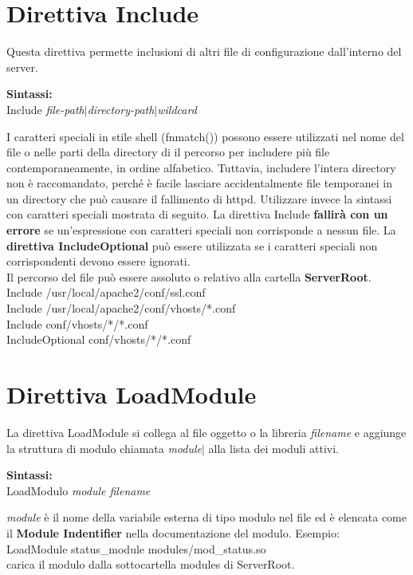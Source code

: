 \section{Direttiva Include}
Questa direttiva permette inclusioni di altri file di configurazione dall'interno del server. 
\begin{center}
    \textbf{Sintassi:}\\
    Include \emph{file-path}$|$\emph{directory-path}$|$\emph{wildcard}
\end{center}
I caratteri speciali in stile shell (fnmatch()) possono essere utilizzati nel nome del file o nelle parti della directory di
il percorso per includere più file contemporaneamente, in ordine alfabetico. Tuttavia, includere l'intera
directory non è raccomandato, perché è facile lasciare accidentalmente file temporanei in un
directory che può causare il fallimento di httpd. Utilizzare invece la sintassi con caratteri speciali mostrata di seguito.
La direttiva Include \textbf{fallirà con un errore} se un'espressione con caratteri speciali non corrisponde a nessun
file. La \textbf{direttiva IncludeOptional} può essere utilizzata se i caratteri speciali non corrispondenti devono essere
ignorati.\\
Il percorso del file può essere assoluto o relativo alla cartella \textbf{ServerRoot}.\vspace{0.2cm}\\
Include /usr/local/apache2/conf/ssl.conf\\
Include /usr/local/apache2/conf/vhosts/*.conf\\
Include conf/vhosts/*/*.conf\\
IncludeOptional conf/vhosts/*/*.conf\\

\section{Direttiva LoadModule}
La direttiva LoadModule si collega al file oggetto o la libreria \emph{filename} e aggiunge la struttura di modulo chiamata \emph{module}$|$ alla lista dei moduli attivi. 
\begin{center}
    \textbf{Sintassi:}\\
    LoadModulo \emph{module filename}
\end{center}
\emph{module} è il nome della variabile esterna di tipo modulo nel file ed è elencata come il \textbf{Module Indentifier} nella documentazione del modulo. Esempio: \vspace{0.1cm}\\
LoadModule status\_module modules/mod\_status.so \vspace{0.1cm}\\
carica il modulo dalla sottocartella modules di ServerRoot.

